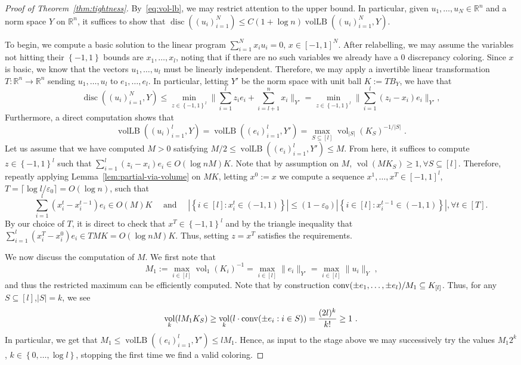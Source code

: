\documentclass{article}
\newcommand{\R}{{\mathbb{R}}}
\newcommand\eps{\varepsilon}
\newcommand{\set}[1]{\left\{ #1 \right\}}
\DeclareMathOperator{\vollb}{volLB}
\DeclareMathOperator{\disc}{disc}
\DeclareMathOperator{\vol}{vol}
\begin{document}
\begin{proof}[Proof of Theorem~\ref{thm:tightness}]
By~\eqref{eq:vol-lb}, we may restrict attention to the upper bound. In particular,
given $u_1,\dots,u_N \in \R^n$ and a norm space $Y$ on $\R^n$, it suffices to
show that $\disc((u_i)_{i=1}^N) \leq C(1+\log n)\vollb((u_i)_{i=1}^N,Y)$.  

To begin, we compute a basic solution to the linear program $\sum_{i=1}^N x_i
u_i = 0$, $x \in [-1,1]^N$. After relabelling, we may assume the variables not
hitting their $\set{-1,1}$ bounds are $x_1,\dots,x_l$, noting that if there are
no such variables we already have a $0$ discrepancy coloring. Since
$x$ is basic, we know that the vectors $u_1,\dots,u_l$ must be linearly
independent. Therefore, we may apply a invertible linear
transformation $T:\R^n \rightarrow \R^n$ sending $u_1,\dots,u_l$ to
$e_1,\dots,e_l$. In particular, letting $Y'$ be the norm space with unit ball $K
:= TB_Y$, we have that 
\[
\disc((u_i)_{i=1}^N,Y) \leq \min_{z \in \set{-1,1}^l} \|\sum_{i=1}^l z_i e_i +
\sum_{i=l+1}^n x_i\|_{Y'} = \min_{z \in \set{-1,1}^l} \|\sum_{i=1}^l (z_i-x_i)e_i\|_{Y'}, 
\] 
Furthermore, a direct computation shows that
\[
\vollb((u_i)_{i=1}^l,Y) = \vollb((e_i)_{i=1}^l,Y') = \max_{S \subseteq [l]}
\vol_{|S|}(K_S)^{-1/|S|} \text{ .}
\] 
Let us assume that we have computed $M > 0$ satisfying $M/2 \leq
\vollb((e_i)_{i=1}^l,Y') \leq M$. From here, it suffices to compute $z \in
\set{-1,1}^l$ such that $\sum_{i=1}^l (z_i-x_i) e_i \in O(\log n M) K$. Note
that by assumption on $M$, $\vol(MK_S) \geq 1, \forall S \subseteq [l]$.
Therefore, repeatly applying Lemma~\ref{lem:partial-via-volume} on $MK$, letting $x^0 := x$ we compute a sequence
$x^1,\dots,x^T \in [-1,1]^l$, $T = \lceil \log l/\eps_0
\rceil = O(\log n)$, such that 
\[
\sum_{i=1}^l (x^t_i-x^{t-1}_i)e_i \in O(M) K \quad \text{ and } \quad |\set{i
\in [l]:
x^t_i \in (-1,1)}| \leq (1-\eps_0)|\set{i \in [l]: x^{t-1}_i \in (-1,1)}|, \forall t \in [T] .
\]
By our choice of $T$, it is direct to check that $x^T \in \set{-1,1}^l$ and by
the triangle inequality that $\sum_{i=1}^l (x^T_i-x^0_i)e_i \in T M K = O(\log n
M) K$. Thus, setting $z = x^T$ satisfies the requirements.

We now discuss the computation of $M$. We first note that 
\[
M_1 := \max_{i \in [l]} \vol_1(K_i)^{-1} = \max_{i \in [l]} \|e_i\|_{Y'} =
\max_{i \in [l]} \|u_i\|_Y \text{ ,}
\]
and thus the restricted maximum can be efficiently computed. Note that by
construction ${\rm conv}(\pm e_1,\dots, \pm e_l)/M_1 \subseteq K_{[l]}$. Thus,
for any $S \subseteq [l]$,$|S|=k$, we see
\[
\vol_k(l M_1 K_S) \geq \vol_{k}(l \cdot {\rm conv}(\pm e_i: i \in S)) = \frac{(2l)^k}{k!}
 \geq 1 \text{ .}
\]
In particular, we get that $M_1 \leq \vollb((e_i)_{i=1}^l,Y') \leq l M_1$.
Hence, as input to the stage above we may successively try the values $M_1
2^k$, $k \in \set{0,\dots,\log l}$, stopping the first time we find a valid
coloring. 
\end{proof}
\end{document}
